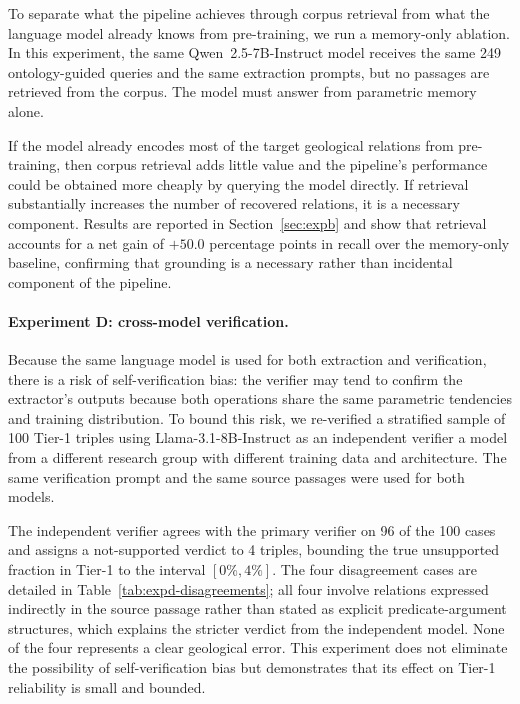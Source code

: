 \documentclass[10pt]{article}
\begin{document}
To separate what the pipeline achieves through corpus
retrieval from what the language model already knows from
pre-training, we run a memory-only ablation.
In this experiment, the same Qwen~2.5-7B-Instruct model
receives the same 249 ontology-guided queries and the same
extraction prompts, but no passages are retrieved from the
corpus.
The model must answer from parametric memory alone.

If the model already encodes most of the target geological
relations from pre-training, then corpus retrieval adds
little value and the pipeline's performance could be
obtained more cheaply by querying the model directly.
If retrieval substantially increases the number of recovered
relations, it is a necessary component.
Results are reported in Section~\ref{sec:expb} and show
that retrieval accounts for a net gain of $+50.0$ percentage
points in recall over the memory-only baseline, confirming
that grounding is a necessary rather than incidental
component of the pipeline.

\paragraph{Experiment D: cross-model verification.}

Because the same language model is used for both extraction
and verification, there is a risk of self-verification
bias: the verifier may tend to confirm the extractor's
outputs because both operations share the same parametric
tendencies and training distribution.
To bound this risk, we re-verified a stratified sample of
100 Tier-1 triples using Llama-3.1-8B-Instruct
\citep{touvron2023llama} as an independent verifier a
model from a different research group with different
training data and architecture.
The same verification prompt and the same source passages
were used for both models.

The independent verifier agrees with the primary verifier
on 96 of the 100 cases and assigns a not-supported verdict
to 4 triples, bounding the true unsupported fraction in
Tier-1 to the interval $[0\%, 4\%]$.
The four disagreement cases are detailed in
Table~\ref{tab:expd-disagreements}; all four involve
relations expressed indirectly in the source passage rather
than stated as explicit predicate-argument structures,
which explains the stricter verdict from the independent
model.
None of the four represents a clear geological error.
This experiment does not eliminate the possibility of
self-verification bias but demonstrates that its effect
on Tier-1 reliability is small and bounded.
\end{document}
